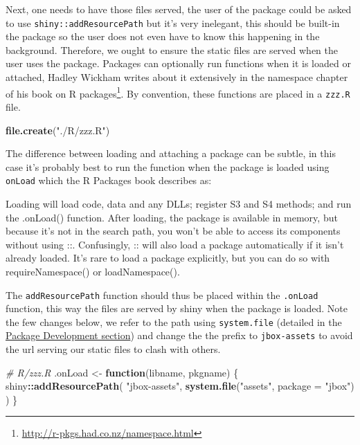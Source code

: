 \documentclass[
]{krantz}
\makeatletter
\newenvironment{Shaded}{\begin{snugshade}}{\end{snugshade}}
\newcommand{\CommentTok}[1]{\textcolor[rgb]{0.37,0.37,0.37}{\textit{#1}}}
\newcommand{\ControlFlowTok}[1]{\textcolor[rgb]{0.27,0.27,0.27}{\textbf{#1}}}
\newcommand{\DataTypeTok}[1]{\textcolor[rgb]{0.27,0.27,0.27}{#1}}
\newcommand{\KeywordTok}[1]{\textcolor[rgb]{0.27,0.27,0.27}{\textbf{#1}}}
\newcommand{\NormalTok}[1]{#1}
\newcommand{\OperatorTok}[1]{\textcolor[rgb]{0.43,0.43,0.43}{\textbf{#1}}}
\newcommand{\StringTok}[1]{\textcolor[rgb]{0.5,0.5,0.5}{#1}}
\renewenvironment{quote}{\begin{VF}}{\end{VF}}
\renewcommand{\href}[2]{#2\footnote{\url{#1}}}
\newenvironment{kframe}{%
\medskip{}
\setlength{\fboxsep}{.8em}
 \def\at@end@of@kframe{}%
 \ifinner\ifhmode%
  \def\at@end@of@kframe{\end{minipage}}%
  \begin{minipage}{\columnwidth}%
 \fi\fi%
 \def\FrameCommand##1{\hskip\@totalleftmargin \hskip-\fboxsep
 \colorbox{shadecolor}{##1}\hskip-\fboxsep
     \hskip-\linewidth \hskip-\@totalleftmargin \hskip\columnwidth}%
 \MakeFramed {\advance\hsize-\width
   \@totalleftmargin\z@ \linewidth\hsize
   \@setminipage}}%
 {\par\unskip\endMakeFramed%
 \at@end@of@kframe}
\renewenvironment{Shaded}{\begin{kframe}}{\end{kframe}}
\makeatother
\begin{document}
Next, one needs to have those files served, the user of the package could be asked to use \texttt{shiny::addResourcePath} but it's very inelegant, this should be built-in the package so the user does not even have to know this happening in the background. Therefore, we ought to ensure the static files are served when the user uses the package. Packages can optionally run functions when it is loaded or attached, Hadley Wickham writes about it extensively in the namespace chapter of his \href{http://r-pkgs.had.co.nz/namespace.html}{book on R packages}. By convention, these functions are placed in a \texttt{zzz.R} file.

\begin{Shaded}
\begin{Highlighting}[]
\KeywordTok{file.create}\NormalTok{(}\StringTok{"./R/zzz.R"}\NormalTok{)}
\end{Highlighting}
\end{Shaded}

The difference between loading and attaching a package can be subtle, in this case it's probably best to run the function when the package is loaded using \texttt{onLoad} which the R Packages book describes as:

\begin{quote}
Loading will load code, data and any DLLs; register S3 and S4 methods; and run the .onLoad() function. After loading, the package is available in memory, but because it's not in the search path, you won't be able to access its components without using ::. Confusingly, :: will also load a package automatically if it isn't already loaded. It's rare to load a package explicitly, but you can do so with requireNamespace() or loadNamespace().
\end{quote}

The \texttt{addResourcePath} function should thus be placed within the \texttt{.onLoad} function, this way the files are served by shiny when the package is loaded. Note the few changes below, we refer to the path using \texttt{system.file} (detailed in the \protect\hyperlink{package-development}{Package Development section}) and change the the prefix to \texttt{jbox-assets} to avoid the url serving our static files to clash with others.

\begin{Shaded}
\begin{Highlighting}[]
\CommentTok{\# R/zzz.R}
\NormalTok{.onLoad <{-}}\StringTok{ }\ControlFlowTok{function}\NormalTok{(libname, pkgname) \{}
\NormalTok{  shiny}\OperatorTok{::}\KeywordTok{addResourcePath}\NormalTok{(}
    \StringTok{"jbox{-}assets"}\NormalTok{,}
    \KeywordTok{system.file}\NormalTok{(}\StringTok{"assets"}\NormalTok{, }\DataTypeTok{package =} \StringTok{"jbox"}\NormalTok{)}
\NormalTok{  )}
\NormalTok{\}}
\end{Highlighting}
\end{Shaded}
\end{document}

